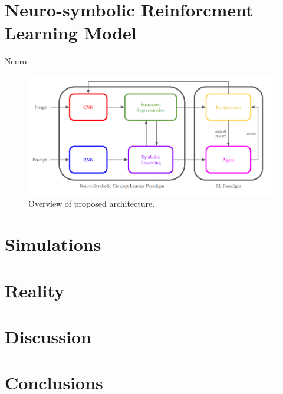 \documentclass[doublespace,draft,nopageskip]{VTthesis} %
\begin{document}
    \chapter{Neuro-symbolic Reinforcment Learning Model}
    Neuro\\
    \begin{figure}[htb]
        \centering
		    \includegraphics[scale=0.25]{./images/architecture_overview}
				\caption{Overview of proposed architecture.} 
			\label{fig:architecture_overview}
	\end{figure}


	\chapter{Simulations} \label{ch:simulations}
	\chapter{Reality} \label{ch:reality}
	\chapter{Discussion} \label{ch:discussion}
	\chapter{Conclusions} \label{ch:conclusions}

\end{document}
